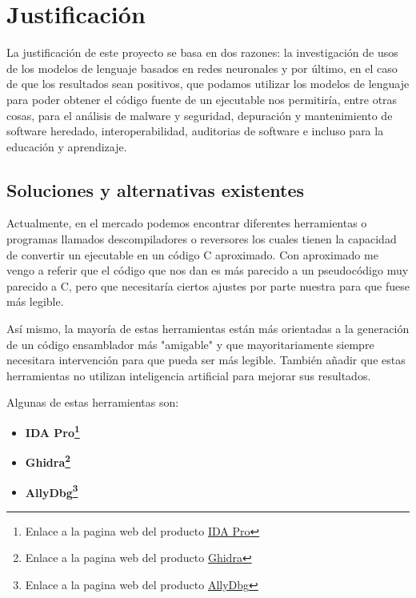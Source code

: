 \chapter{Justificación}
\label{cap:justificacion}


La justificación de este proyecto se basa en dos razones: la investigación de usos de los modelos de lenguaje basados en redes neuronales y por último,
en el caso de que los resultados sean positivos, que podamos utilizar los modelos de lenguaje para poder obtener el código fuente de un ejecutable nos
permitiría, entre otras cosas, para el análisis de malware y seguridad, depuración y mantenimiento de software heredado, interoperabilidad, auditorias
de software e incluso para la educación y aprendizaje.

\section{Soluciones y alternativas existentes}
\label{sec:alternativas}


Actualmente, en el mercado podemos encontrar diferentes herramientas o programas llamados descompiladores o reversores los cuales tienen la capacidad de convertir un ejecutable
en un código C aproximado. Con aproximado me vengo a referir que el código que nos dan es más parecido a un pseudocódigo muy parecido a C, pero que necesitaría ciertos ajustes
por parte nuestra para que fuese más legible.

Así mismo, la mayoría de estas herramientas están más orientadas a la generación de un código ensamblador más "amigable" y que mayoritariamente siempre necesitara intervención
para que pueda ser más legible. También añadir que estas herramientas no utilizan inteligencia artificial para mejorar sus resultados.

Algunas de estas herramientas son:

\begin{itemize}
    \item \bf IDA Pro\footnote{Enlace a la pagina web del producto \href{https://hex-rays.com/ida-pro/}{IDA Pro}}
    \item \bf Ghidra\footnote{Enlace a la pagina web del producto \href{https://ghidra-sre.org/}{Ghidra}}
    \item \bf AllyDbg\footnote{Enlace a la pagina web del producto \href{https://www.ollydbg.de/}{AllyDbg}}
\end{itemize}

